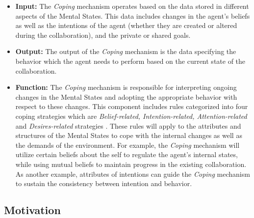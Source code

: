 \documentclass[12pt]{report}
\begin{document}
\begin{itemize}
  \item \textbf{Input:} The \textit{Coping} mechanism operates based on the data
  stored in different aspects of the Mental States. This data includes changes
  in the agent's beliefs as well as the intentions of the agent (whether they
  are created or altered during the collaboration), and the private or shared
  goals.
  
  \item \textbf{Output:} The output of the \textit{Coping} mechanism is the data
  specifying the behavior which the agent needs to perform based on the current
  state of the collaboration.
  
  \item \textbf{Function:} The \textit{Coping} mechanism is responsible for
  interpreting ongoing changes in the Mental States and adopting the appropriate
  behavior with respect to these changes. This component includes rules
  categorized into four coping strategies which are \textit{Belief-related,
  Intention-related, Attention-related} and \textit{Desires-related} strategies
  \cite{marsella:ema-process-model}. These rules will apply to the attributes
  and structures of the Mental States to cope with the internal changes as well
  as the demands of the environment. For example, the \textit{Coping} mechanism
  will utilize certain beliefs about the self to regulate the agent's internal
  states, while using mutual beliefs to maintain progress in the existing
  collaboration. As another example, attributes of intentions can guide the
  \textit{Coping} mechanism to sustain the consistency between intention and
  behavior.
\end{itemize}

\subsection{Motivation}
\label{section-motivation-mechanism}
\end{document}

